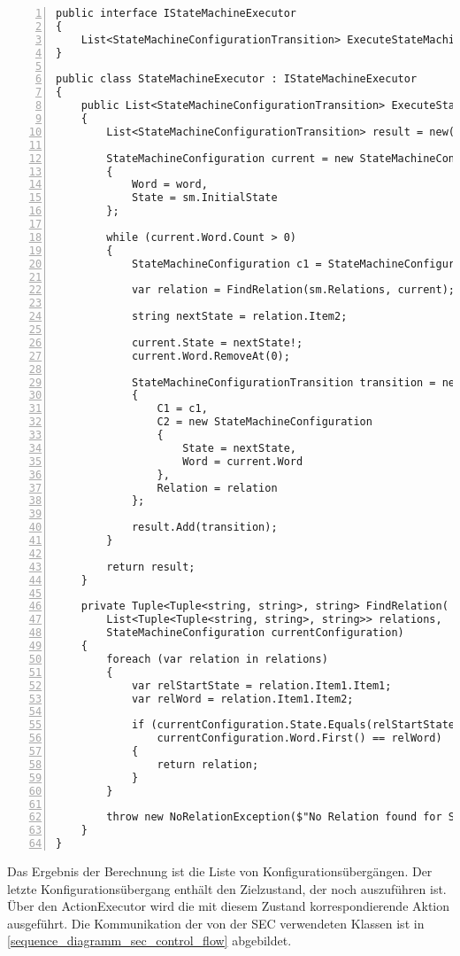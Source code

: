 \begin{lstlisting}[language={[Sharp]C}, breaklines=true, tabsize=2, showstringspaces=false, frame=single, numbers=left, basicstyle=\small] 
public interface IStateMachineExecutor
{
	List<StateMachineConfigurationTransition> ExecuteStateMachine(StateMachine sm, List<Status> word);
}

public class StateMachineExecutor : IStateMachineExecutor
{
	public List<StateMachineConfigurationTransition> ExecuteStateMachine(StateMachine sm, List<string> word)
	{
		List<StateMachineConfigurationTransition> result = new();
		
		StateMachineConfiguration current = new StateMachineConfiguration
		{
			Word = word,
			State = sm.InitialState
		};
		
		while (current.Word.Count > 0)
		{
			StateMachineConfiguration c1 = StateMachineConfiguration.Clone(current);
			
			var relation = FindRelation(sm.Relations, current);
			
			string nextState = relation.Item2;
						
			current.State = nextState!;
			current.Word.RemoveAt(0);
			
			StateMachineConfigurationTransition transition = new()
			{
				C1 = c1,
				C2 = new StateMachineConfiguration
				{
					State = nextState,
					Word = current.Word
				},
				Relation = relation
			};
			
			result.Add(transition);
		}
		
		return result;
	}
	
	private Tuple<Tuple<string, string>, string> FindRelation(
		List<Tuple<Tuple<string, string>, string>> relations, 	
		StateMachineConfiguration currentConfiguration)
	{
		foreach (var relation in relations)
		{
			var relStartState = relation.Item1.Item1;
			var relWord = relation.Item1.Item2;
			
			if (currentConfiguration.State.Equals(relStartState) && 
				currentConfiguration.Word.First() == relWord)
			{
				return relation;
			}
		}
		
		throw new NoRelationException($"No Relation found for State = [{currentConfiguration.State}] and Element = [{currentConfiguration.Word.First()}]");
	}
}
\end{lstlisting}

Das Ergebnis der Berechnung ist die Liste von Konfigurationsübergängen. Der letzte Konfigurationsübergang enthält den Zielzustand, der noch auszuführen ist. Über den ActionExecutor wird die mit diesem Zustand korrespondierende Aktion ausgeführt. Die Kommunikation der von der SEC verwendeten Klassen ist in \cref{sequence_diagramm_sec_control_flow} abgebildet. 

